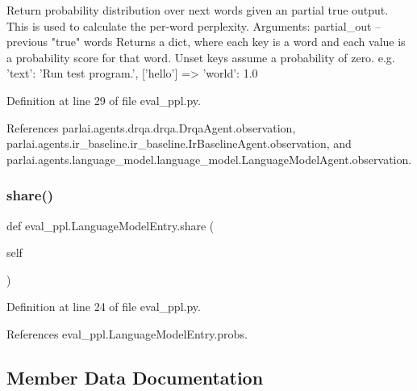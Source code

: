 \begin{DoxyVerb}Return probability distribution over next words given an partial
true output. This is used to calculate the per-word perplexity.
Arguments:
partial_out -- previous "true" words
Returns a dict, where each key is a word and each value is a probability
score for that word. Unset keys assume a probability of zero.
e.g.
{'text': 'Run test program.'}, ['hello'] => {'world': 1.0}
\end{DoxyVerb}
 

Definition at line 29 of file eval\+\_\+ppl.\+py.



References parlai.\+agents.\+drqa.\+drqa.\+Drqa\+Agent.\+observation, parlai.\+agents.\+ir\+\_\+baseline.\+ir\+\_\+baseline.\+Ir\+Baseline\+Agent.\+observation, and parlai.\+agents.\+language\+\_\+model.\+language\+\_\+model.\+Language\+Model\+Agent.\+observation.

\mbox{\label{classeval__ppl_1_1LanguageModelEntry_afaf442afdbe4e60c6ba23ef124580833}} 
\subsubsection{\texorpdfstring{share()}{share()}}
{\footnotesize\ttfamily def eval\+\_\+ppl.\+Language\+Model\+Entry.\+share (\begin{DoxyParamCaption}\item[{}]{self }\end{DoxyParamCaption})}



Definition at line 24 of file eval\+\_\+ppl.\+py.



References eval\+\_\+ppl.\+Language\+Model\+Entry.\+probs.



\subsection{Member Data Documentation}
\mbox{\label{classeval__ppl_1_1LanguageModelEntry_a0c227eedb0c0436603b7fb7e6e99fd95}} 

